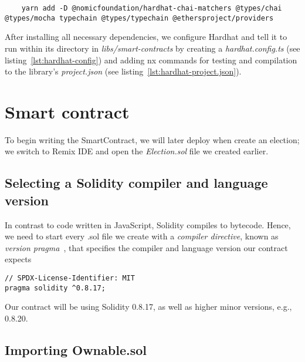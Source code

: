 \begin{verbatim}
    yarn add -D @nomicfoundation/hardhat-chai-matchers @types/chai @types/mocha typechain @types/typechain @ethersproject/providers
\end{verbatim}

After installing all necessary dependencies, we configure Hardhat and tell it to run within its directory in \emph{libs/smart-contracts} by creating a \emph{hardhat.config.ts} (see listing~\ref{lst:hardhat-config}) and adding nx commands for testing and compilation to the library's \emph{project.json} (see listing~\ref{lst:hardhat-project.json}).


\section{Smart contract}\label{sec:smart-contract}

To begin writing the \gls{SmartContract}, we will later deploy when  create an election; we switch to Remix \gls{IDE} and open the \emph{Election.sol} file we created earlier.

\subsection{Selecting a Solidity compiler and language version}\label{subsec:selecting-a-solidity-compiler-and-language-version}

In contrast to code written in JavaScript, Solidity compiles to bytecode.
Hence, we need to start every .sol file we create with a \emph{compiler directive}, known as \emph{version pragma}~\autocite[135]{antonopoulos_mastering_2019}, that specifies the compiler and language version our contract expects

\begin{verbatim}
// SPDX-License-Identifier: MIT
pragma solidity ^0.8.17;
\end{verbatim}

Our contract will be using Solidity 0.8.17, as well as higher minor versions, e.g., 0.8.20.

\subsection{Importing Ownable.sol}\label{subsec:impotring-ownable.sol}

